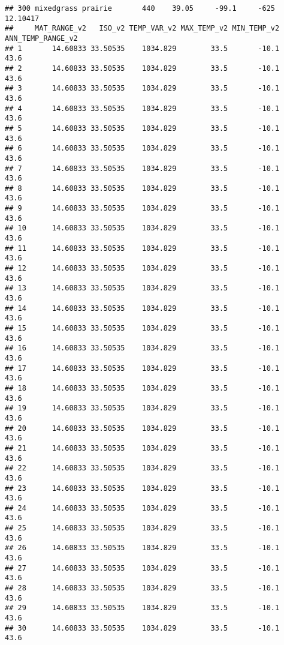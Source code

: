 \documentclass[]{article}
\begin{document}
\begin{verbatim}
## 300 mixedgrass prairie       440    39.05     -99.1     -625 12.10417
##     MAT_RANGE_v2   ISO_v2 TEMP_VAR_v2 MAX_TEMP_v2 MIN_TEMP_v2 ANN_TEMP_RANGE_v2
## 1       14.60833 33.50535    1034.829        33.5       -10.1              43.6
## 2       14.60833 33.50535    1034.829        33.5       -10.1              43.6
## 3       14.60833 33.50535    1034.829        33.5       -10.1              43.6
## 4       14.60833 33.50535    1034.829        33.5       -10.1              43.6
## 5       14.60833 33.50535    1034.829        33.5       -10.1              43.6
## 6       14.60833 33.50535    1034.829        33.5       -10.1              43.6
## 7       14.60833 33.50535    1034.829        33.5       -10.1              43.6
## 8       14.60833 33.50535    1034.829        33.5       -10.1              43.6
## 9       14.60833 33.50535    1034.829        33.5       -10.1              43.6
## 10      14.60833 33.50535    1034.829        33.5       -10.1              43.6
## 11      14.60833 33.50535    1034.829        33.5       -10.1              43.6
## 12      14.60833 33.50535    1034.829        33.5       -10.1              43.6
## 13      14.60833 33.50535    1034.829        33.5       -10.1              43.6
## 14      14.60833 33.50535    1034.829        33.5       -10.1              43.6
## 15      14.60833 33.50535    1034.829        33.5       -10.1              43.6
## 16      14.60833 33.50535    1034.829        33.5       -10.1              43.6
## 17      14.60833 33.50535    1034.829        33.5       -10.1              43.6
## 18      14.60833 33.50535    1034.829        33.5       -10.1              43.6
## 19      14.60833 33.50535    1034.829        33.5       -10.1              43.6
## 20      14.60833 33.50535    1034.829        33.5       -10.1              43.6
## 21      14.60833 33.50535    1034.829        33.5       -10.1              43.6
## 22      14.60833 33.50535    1034.829        33.5       -10.1              43.6
## 23      14.60833 33.50535    1034.829        33.5       -10.1              43.6
## 24      14.60833 33.50535    1034.829        33.5       -10.1              43.6
## 25      14.60833 33.50535    1034.829        33.5       -10.1              43.6
## 26      14.60833 33.50535    1034.829        33.5       -10.1              43.6
## 27      14.60833 33.50535    1034.829        33.5       -10.1              43.6
## 28      14.60833 33.50535    1034.829        33.5       -10.1              43.6
## 29      14.60833 33.50535    1034.829        33.5       -10.1              43.6
## 30      14.60833 33.50535    1034.829        33.5       -10.1              43.6

\end{verbatim}
\end{document}
